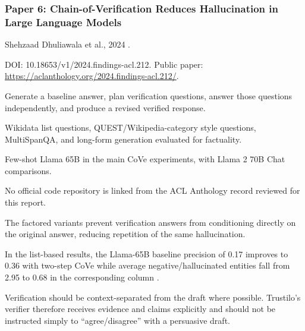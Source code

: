 \documentclass[11pt,journal,onecolumn]{IEEEtran}
\begin{document}
\subsubsection{Paper 6: Chain-of-Verification Reduces Hallucination in Large Language Models}
\begin{description}[leftmargin=3.25cm,style=nextline]
\item[Authors / Year] Shehzaad Dhuliawala et al., 2024 \cite{dhuliawala2024cove}.
\item[DOI / Link] DOI: 10.18653/v1/2024.findings-acl.212. Public paper: \url{https://aclanthology.org/2024.findings-acl.212/}.
\item[Main idea] Generate a baseline answer, plan verification questions, answer those questions independently, and produce a revised verified response.
\item[Datasets] Wikidata list questions, QUEST/Wikipedia-category style questions, MultiSpanQA, and long-form generation evaluated for factuality.
\item[Models] Few-shot Llama 65B in the main CoVe experiments, with Llama 2 70B Chat comparisons.
\item[Code] No official code repository is linked from the ACL Anthology record reviewed for this report.
\item[Procedure / tricks] The factored variants prevent verification answers from conditioning directly on the original answer, reducing repetition of the same hallucination.
\item[Metrics / results] In the list-based results, the Llama-65B baseline precision of 0.17 improves to 0.36 with two-step CoVe while average negative/hallucinated entities fall from 2.95 to 0.68 in the corresponding column \cite{dhuliawala2024cove}.
\item[Key learning] Verification should be context-separated from the draft where possible. Trustilo's verifier therefore receives evidence and claims explicitly and should not be instructed simply to ``agree/disagree'' with a persuasive draft.
\end{description}
\end{document}
